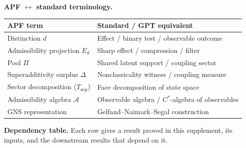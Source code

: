 \documentclass[11pt]{article}
\theoremstyle{definition}
\begin{document}
\smallskip\noindent\textbf{APF $\leftrightarrow$ standard terminology.}

\smallskip
\begin{center}\small
\renewcommand{\arraystretch}{1.15}
\begin{tabular}{@{}ll@{}}
\toprule
\textbf{APF term} & \textbf{Standard / GPT equivalent} \\
\midrule
Distinction $d$ & Effect / binary test / observable outcome \\
Admissibility projection $E_d$ & Sharp effect / compression / filter \\
Pool $\Pi$ & Shared latent support / coupling sector \\
Superadditivity surplus $\Delta$ & Nonclassicality witness / coupling measure \\
Sector decomposition ($T_{\mathrm{sep}}$) & Face decomposition of state space \\
Admissibility algebra $\mathcal{A}$ & Observable algebra / $C^*$-algebra of observables \\
GNS representation & Gelfand--Naimark--Segal construction \\
\bottomrule
\end{tabular}
\end{center}




\medskip\noindent\textbf{Dependency table.}  Each row gives a result proved in this supplement, its inputs, and the downstream results that depend on it.
\end{document}

